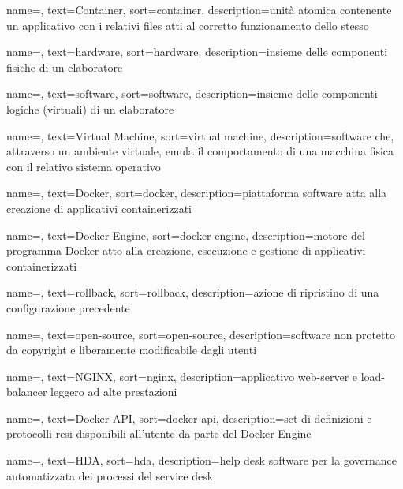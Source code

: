 {
    name=,
    text=Container,
    sort=container, 
    description={unità atomica contenente un applicativo con i relativi files atti al corretto funzionamento dello stesso}
}

{
    name=,
    text=hardware,
    sort=hardware, 
    description={insieme delle componenti fisiche di un elaboratore}
}

{
    name=,
    text=software,
    sort=software, 
    description={insieme delle componenti logiche (virtuali) di un elaboratore}
}

{
    name=,
    text=Virtual Machine,
    sort=virtual machine, 
    description={software che, attraverso un ambiente virtuale, emula il comportamento di una macchina fisica con il relativo sistema operativo}
}

{
    name=,
    text=Docker,
    sort=docker, 
    description={piattaforma software atta alla creazione di applicativi containerizzati}
}

{
    name=,
    text=Docker Engine,
    sort=docker engine, 
    description={motore del programma Docker atto alla creazione, esecuzione e gestione di applicativi containerizzati}
}

{
    name=,
    text=rollback,
    sort=rollback, 
    description={azione di ripristino di una configurazione precedente}
}

{
    name=,
    text=open-source,
    sort=open-source, 
    description={software non protetto da copyright e liberamente modificabile dagli utenti}
}

{
    name=,
    text=NGINX,
    sort=nginx, 
    description={applicativo web-server e load-balancer leggero ad alte prestazioni}
}

{
    name=,
    text=Docker API,
    sort=docker api, 
    description={set di definizioni e protocolli resi disponibili all'utente da parte del Docker Engine}
}

{
    name=,
    text=HDA,
    sort=hda, 
    description={help desk software per la governance automatizzata dei processi del service desk}
}

